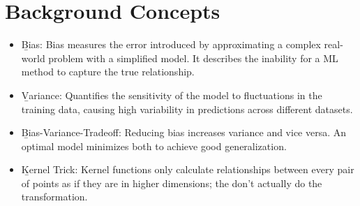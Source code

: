 \section{Background Concepts}
\begin{itemize}
    \item \b{Bias:} Bias measures the error introduced by approximating a complex real-world problem with a simplified model. It describes the inability for a ML method to capture the true relationship.
    \item \b{Variance:} Quantifies the sensitivity of the model to fluctuations in the training data, causing high variability in predictions across different datasets.
    \item \b{Bias-Variance-Tradeoff:} Reducing bias increases variance and vice versa. An optimal model minimizes both to achieve good generalization.
    \item \b{Kernel Trick:} Kernel functions only calculate relationships between every pair of points as if they are in higher dimensions; the don't actually do the transformation.
\end{itemize}

